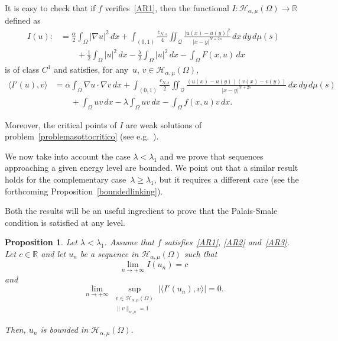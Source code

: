 \documentclass[12pt,a4paper,intlimits,sumlimits]{amsart}
\def \R {\mathbb{R}}
\def \Q {\mathcal Q}
\theoremstyle{definition}
\theoremstyle{plain}
\newtheorem{proposition}[definition]{Proposition}
\numberwithin{equation}{section}
\renewcommand{\ge}{\geqslant}
\begin{document}
It is easy to check that if $f$ verifies~\eqref{AR1}, then the functional $I:\mathcal{H}_{\alpha, \mu}(\Omega)\to\R$ defined as
\begin{equation}\label{fun1}
\begin{split}
I(u):&= \frac{\alpha}{2}\int_\Omega |\nabla u|^2 \,dx +\int_{(0, 1)} \frac{c_{N, s}}{4} \iint_{\Q} \frac{|u(x)-u(y)|^2}{|x-y|^{N+2s}} \,dx\,dy\, d\mu(s)\\
&\qquad+\frac12 \int_{\Omega} |u|^2 \, dx -\frac{\lambda}{2} \int_{\Omega} |u|^2 \, dx - \int_\Omega F(x, u) \, dx
\end{split}
\end{equation}
is of class $C^1$ and satisfies, for any~$u$, $v\in \mathcal{H}_{\alpha, \mu}(\Omega)$,
\begin{equation}\label{diff1}
\begin{split}
\langle I'(u), v\rangle &=\alpha \int_\Omega \nabla u\cdot\nabla v\, dx +\int_{(0, 1)} \frac{c_{N, s}}{2} \iint_{\Q} \frac{(u(x)-u(y))(v(x)-v(y))}{|x-y|^{N+2s}} \,dx\,dy\, d\mu(s)\\
&\qquad+\int_\Omega uv\, dx - \lambda\int_\Omega uv\, dx - \int_\Omega f(x, u) v \, dx.
\end{split}
\end{equation}

Moreover, the critical points of $I$ are weak solutions of problem~\eqref{problemasottocritico} (see e.g.~\cite[Proposition~4.2]{TUTTI}).

We now take into account the case $\lambda<\lambda_1$ and we prove that sequences approaching a given energy level are bounded.  We point out that a similar result holds for the complementary case~$\lambda\ge\lambda_1$, but it requires a different care (see the forthcoming Proposition~\ref{boundedlinking}).

Both the results will be an useful ingredient to prove that the Palais-Smale condition is satisfied at any level.

\begin{proposition}\label{PropPS1}
Let $\lambda<\lambda_1$.
Assume that $f$ satisfies~\eqref{AR1}, \eqref{AR2} and~\eqref{AR3}. Let $c\in\R$ and let $u_n$ be a sequence in $\mathcal{H}_{\alpha, \mu}(\Omega)$ such that
\begin{equation}\label{bdd1}
\lim_{n\to +\infty} I(u_n)=c
\end{equation}
and
\begin{equation}\label{bdd2}
\lim_{n\to +\infty} \sup_{\substack{v\in \mathcal{H}_{\alpha, \mu}(\Omega)\\ \|v\|_{\alpha, \mu}=1}} |\langle I'(u_n), v\rangle| =0.
\end{equation}

Then, $u_n$ is bounded in $\mathcal{H}_{\alpha, \mu}(\Omega)$.
\end{proposition}
\end{document}
